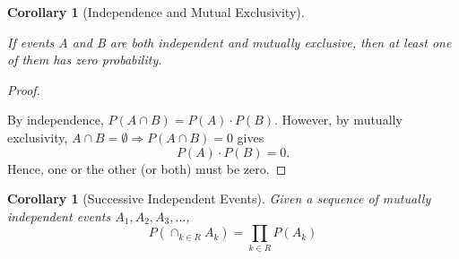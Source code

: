 \documentclass[10pt,]{book}
\theoremstyle{plain}
\newtheorem{corollary}[theorem]{Corollary}
\theoremstyle{definition}
\theoremstyle{definition}
\theoremstyle{definition}
\numberwithin{equation}{section}
\begin{document}
\begin{corollary}[{Independence and Mutual Exclusivity}]\label{corollary-4}

			If events A and B are both independent and mutually exclusive, then at least one of them has zero probability.
		\end{corollary}
\begin{proof}\hypertarget{proof-21}{}

			By independence, \(P(A \cap B) = P(A) \cdot P(B)\). However, by mutually exclusivity, \(A \cap B = \emptyset \Rightarrow P(A \cap B) = 0\) gives
			\begin{equation*}P(A) \cdot P(B) = 0.\end{equation*}
			Hence, one or the other (or both) must be zero.
\end{proof}
\begin{corollary}[{Successive Independent Events}]\label{corollary-5}
Given a sequence of mutually independent events \(A_1, A_2, A_3, ...\),
		\begin{equation*}P(\cap_{k \in R} A_k) = \prod_{k \in R} P(A_k)\end{equation*}\end{corollary}
\typeout{************************************************}
\typeout{************************************************}
\end{document}

